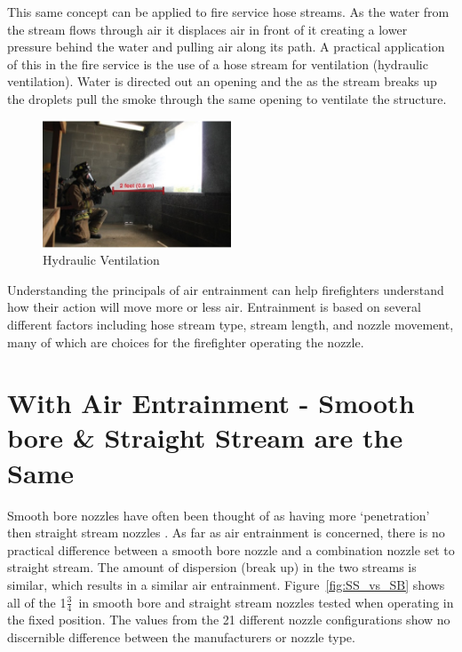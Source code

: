 \documentclass[12pt,oneside]{book}
\begin{document}
This same concept can be applied to fire service hose streams. As the water from the stream flows through air it displaces air in front of it creating a lower pressure behind the water and pulling air along its path. A practical application of this in the fire service is the use of a hose stream for ventilation (hydraulic ventilation). Water is directed out an opening and the as the stream breaks up the droplets pull the smoke through the same opening to ventilate the structure.

\begin{figure}[H]
\centering
\includegraphics[width=0.5\textwidth]{Figures/Air_Entrainment/Hydraulic_Ventilation.png}
\caption{Hydraulic Ventilation}
\label{fig:Hydraulic_Vent}
\end{figure}
 
Understanding the principals of air entrainment can help firefighters understand how their action will move more or less air. Entrainment is based on several different factors including hose stream type, stream length, and nozzle movement, many of which are choices for the firefighter operating the nozzle.

\section{With Air Entrainment - Smooth bore \& Straight Stream are the Same} 
Smooth bore nozzles have often been thought of as having more `penetration' then straight stream nozzles \cite{Klaene:1}. As far as air entrainment is concerned, there is no practical difference between a smooth bore nozzle and a combination nozzle set to straight stream. The amount of dispersion (break up) in the two streams is similar, which results in a similar air entrainment. Figure~\ref{fig:SS_vs_SB} shows all of the 1$\frac{3}{4}$~in smooth bore and straight stream nozzles tested when operating in the fixed position. The values from the 21 different nozzle configurations show no discernible difference between the manufacturers or nozzle type.
\end{document}
